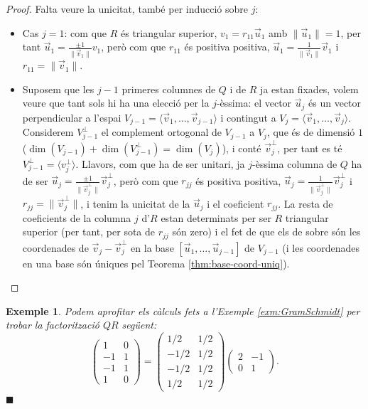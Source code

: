 \documentclass[
  11pt,
]{book}
\numberwithin{dummy}{section}
\theoremstyle{maincolornumbox}
\theoremstyle{blacknumex}
\newtheorem{exampleT}{Exemple}[chapter]
\theoremstyle{blacknumbox}
\theoremstyle{maincolornum}
\newenvironment{example}{\begin{exampleT}}{\hfill{\tiny\ensuremath{\blacksquare}}\end{exampleT}}
\newlength\esp
\begin{document}
\begin{proof}
Falta veure la unicitat, també per inducció sobre \(j\):

\begin{itemize}
\item
  Cas \(j=1\): com que \(R\) és triangular superior, \(v_1=r_{11}\vec u_1\)
  amb \(\|\vec u_1\|=1\), per tant
  \(\vec u_1=\frac{\pm1}{\|\vec v_1\|}v_1\), però com que \(r_{11}\) és
  positiva positiva, \(\vec u_1=\frac{1}{\|\vec v_1\|}\vec v_1\) i
  \(r_{11}=\|\vec v_1\|\).
\item
  Suposem que les \(j-1\) primeres columnes de \(Q\) i de \(R\) ja estan
  fixades, volem veure que tant sols hi ha una elecció per la
  \(j\)-èssima: el vector \(\vec u_j\) és un vector perpendicular a
  l'espai \(V_{j-1}=\langle \vec v_1, \dots, \vec v_{j-1}\rangle\) i
  contingut a \(V_j=\langle \vec v_1, \dots, \vec v_j\rangle\).
  Considerem \(V_{j-1}^\perp\) el complement ortogonal de \(V_{j-1}\) a
  \(V_j\), que és de dimensió \(1\)
  (\(\dim(V_{j-1})+\dim(V_{j-1}^\perp)=\dim(V_j)\)), i conté
  \(\vec v_j^\perp\), per tant es té
  \(V_{j-1}^\perp=\langle v_j^\perp \rangle\). Llavors, com que ha de
  ser unitari, ja \(j\)-èssima columna de \(Q\) ha de ser
  \(\vec u_j=\frac{\pm1}{\|\vec v_j^\perp\|}\vec v_j^\perp\), però com
  que \(r_{jj}\) és positiva positiva,
  \(\vec u_j=\frac{1}{\|\vec v_j^\perp\|}\vec v_j^\perp\) i
  \(r_{jj}=\|\vec v_j^\perp\|\), i tenim la unicitat de la \(\vec u_j\) i
  el coeficient \(r_{jj}\). La resta de coeficients de la columna \(j\)
  d'\(R\) estan determinats per ser \(R\) triangular superior (per tant,
  per sota de \(r_{jj}\) són zero) i el fet de que els de sobre són les
  coordenades de \(\vec v_j-\vec v_j^\perp\) en la base
  \([\vec u_1,\dots,\vec u_{j-1}]\) de \(V_{j-1}\) (i les coordenades en
  una base són úniques pel
  Teorema \ref{thm:base-coord-uniq}).
\end{itemize}

\end{proof}

\begin{example}
Podem aprofitar els càlculs fets a l'Exemple
\ref{exm:GramSchmidt} per trobar la factorització \(QR\)
següent: \[\begin{pmatrix}
1 & 0 \\ -1 & 1 \\ -1 & 1 \\ 1 & 0
\end{pmatrix}=
\begin{pmatrix}
1/2 & 1/2 \\ -1/2 & 1/2 \\ -1/2 & 1/2 \\ 1/2 & 1/2
\end{pmatrix}
\begin{pmatrix}
2 & -1 \\ 0 & 1
\end{pmatrix}.\]
\end{example}
\end{document}
